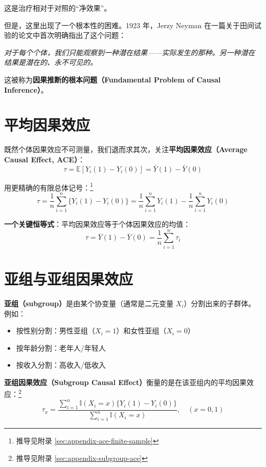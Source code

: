 这是治疗相对于对照的``净效果''。

但是，这里出现了一个根本性的困难。1923 年，Jerzy Neyman 在一篇关于田间试验的论文中首次明确指出了这个问题：

\begin{center}
\textit{对于每个个体，我们只能观察到一种潜在结果——实际发生的那种。另一种潜在结果是潜在的、永不可见的。}
\end{center}

这被称为\textbf{因果推断的根本问题（Fundamental Problem of Causal Inference）}。


\section{平均因果效应}

既然个体因果效应不可测量，我们退而求其次，关注\textbf{平均因果效应（Average Causal Effect, ACE）}：
\[
\tau = \mathbb{E}[Y_i(1) - Y_i(0)] = \bar{Y}(1) - \bar{Y}(0)
\tag{2.1}\label{eq:ace}
\]

用更精确的有限总体记号：\footnote{推导见附录 \cref{sec:appendix-ace-finite-sample}}
\[
\tau = \frac{1}{n} \sum_{i=1}^n \{ Y_i(1) - Y_i(0) \} = \frac{1}{n} \sum_{i=1}^n Y_i(1) - \frac{1}{n} \sum_{i=1}^n Y_i(0)
\tag{2.2}\label{eq:ace-finite}
\]

\textbf{一个关键恒等式}：平均因果效应等于个体因果效应的均值：
\[
\tau = \bar{Y}(1) - \bar{Y}(0) = \frac{1}{n} \sum_{i=1}^n \tau_i
\tag{2.3}\label{eq:ace-ite-mean}
\]

\section{亚组与亚组因果效应}

\textbf{亚组（subgroup）}是由某个协变量（通常是二元变量 $X_i$）分割出来的子群体。例如：
\begin{itemize}
  \item 按性别分割：男性亚组（$X_i=1$）和女性亚组（$X_i=0$）
  \item 按年龄分割：老年人/年轻人
  \item 按收入分割：高收入/低收入
\end{itemize}

\textbf{亚组因果效应（Subgroup Causal Effect）}衡量的是在该亚组内的平均因果效应：\footnote{推导见附录 \cref{sec:appendix-subgroup-ace}}
\[
\tau_x = \frac{\sum_{i=1}^n \mathbb{I}(X_i = x) \{ Y_i(1) - Y_i(0) \}}{\sum_{i=1}^n \mathbb{I}(X_i = x)}, \quad (x = 0, 1)
\tag{2.4}\label{eq:subgroup-ace}
\]

